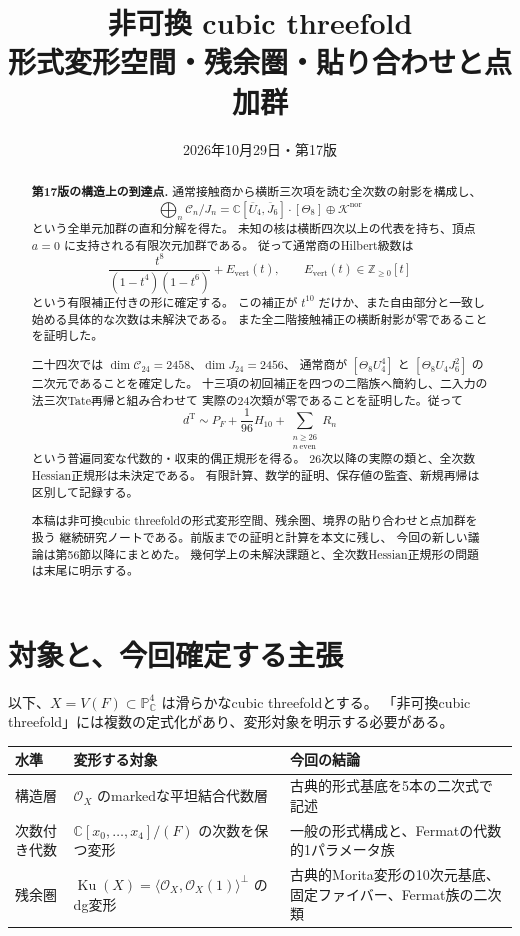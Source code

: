 \documentclass[a4paper,11pt]{ltjsarticle}
\title{\bfseries 非可換 cubic threefold\\[0.35em]
\large 形式変形空間・残余圏・貼り合わせと点加群}
\author{}
\date{2026年10月29日・第17版}
\theoremstyle{definition}
\newcommand{\CC}{\mathbb C}
\newcommand{\OO}{\mathcal O}
\newcommand{\PP}{\mathbb P}
\newcommand{\Ku}{\operatorname{Ku}}
\begin{document}
\maketitle
\vspace{-1.5em}
\begin{abstract}
\noindent\textbf{第17版の構造上の到達点.}
通常接触商から横断三次項を読む全次数の射影を構成し、
\[
 \bigoplus_n\mathcal C_n/J_n
 =\mathbb C[\overline U_4,\overline J_6]\cdot[\Theta_8]
       \oplus\mathcal K^{\mathrm{nor}}
\]
という全単元加群の直和分解を得た。
未知の核は横断四次以上の代表を持ち、頂点 $a=0$ に支持される有限次元加群である。
従って通常商のHilbert級数は
\[
 \frac{t^8}{(1-t^4)(1-t^6)}+E_{\mathrm{vert}}(t),
 \qquad E_{\mathrm{vert}}(t)\in\mathbb Z_{\ge0}[t]
\]
という有限補正付きの形に確定する。
この補正が $t^{10}$ だけか、また自由部分と一致し始める具体的な次数は未解決である。
また全二階接触補正の横断射影が零であることを証明した。

二十四次では $\dim\mathcal C_{24}=2458$、$\dim J_{24}=2456$、
通常商が $[\Theta_8U_4^4]$ と $[\Theta_8U_4J_6^2]$ の二次元であることを確定した。
十三項の初回補正を四つの二階族へ簡約し、二入力の法三次Tate再帰と組み合わせて
実際の24次類が零であることを証明した。従って
\[
 d^{\mathrm T}\sim P_F+\frac1{96}H_{10}
                 +\sum_{\substack{n\ge26\\n\ \mathrm{even}}}R_n
\]
という普遍同変な代数的・収束的偶正規形を得る。
26次以降の実際の類と、全次数Hessian正規形は未決定である。
有限計算、数学的証明、保存値の監査、新規再帰は区別して記録する。

本稿は非可換cubic threefoldの形式変形空間、残余圏、境界の貼り合わせと点加群を扱う
継続研究ノートである。前版までの証明と計算を本文に残し、
今回の新しい議論は第56節以降にまとめた。
幾何学上の未解決課題と、全次数Hessian正規形の問題は末尾に明示する。

\end{abstract}

\section{対象と、今回確定する主張}

以下、$X=V(F)\subset\PP^4_{\CC}$ は滑らかなcubic threefoldとする。
「非可換cubic threefold」には複数の定式化があり、変形対象を明示する必要がある。

\begin{center}
\small
\begin{tabular}{p{}p{}p{}}
\toprule
水準 & 変形する対象 & 今回の結論\\
\midrule
構造層 &
$\OO_X$ のmarkedな平坦結合代数層 &
古典的形式基底を5本の二次式で記述\\
次数付き代数 &
$\CC[x_0,\ldots,x_4]/(F)$ の次数を保つ変形 &
一般の形式構成と、Fermatの代数的1パラメータ族\\
残余圏 &
$\Ku(X)=\langle\OO_X,\OO_X(1)\rangle^\perp$ のdg変形 &
古典的Morita変形の10次元基底、固定ファイバー、Fermat族の二次類\\
\bottomrule
\end{tabular}
\end{center}
\end{document}
